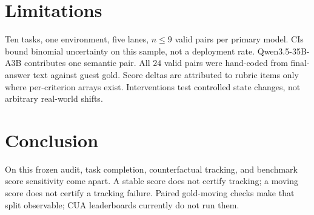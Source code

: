 \documentclass{article}
\begin{document}
\section{Limitations}

Ten tasks, one environment, five lanes, $n\le 9$ valid pairs per primary model.
CIs bound binomial uncertainty on this sample, not a deployment rate.
Qwen3.5-35B-A3B contributes one semantic pair.
All $24$ valid pairs were hand-coded from final-answer text against guest gold.
Score deltas are attributed to rubric items only where per-criterion arrays exist.
Interventions test controlled state changes, not arbitrary real-world shifts.

\section{Conclusion}

On this frozen audit, task completion, counterfactual tracking, and benchmark score sensitivity come apart.
A stable score does not certify tracking; a moving score does not certify a tracking failure.
Paired gold-moving checks make that split observable; CUA leaderboards currently do not run them.



\end{document}
